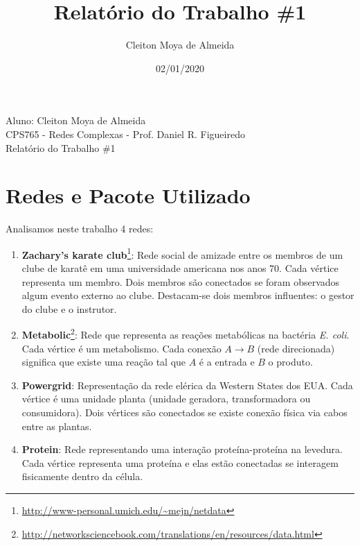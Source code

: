 \documentclass[12pt,a4paper]{article}
\author{\large Cleiton Moya de Almeida}
\title{Relatório do Trabalho \#1}
\date{02/01/2020}
\begin{document}
	
	
	\begin{flushleft}
		\sc Aluno: Cleiton Moya de Almeida \\
		\sc CPS765 - Redes Complexas - Prof. Daniel R. Figueiredo \\
		\sc Relatório do Trabalho \#1
	\end{flushleft}
	
%	
	
	\section{Redes e Pacote Utilizado}
	
	Analisamos neste trabalho 4 redes:
	
	\begin{enumerate}
		\item \textbf{Zachary's karate club}\footnote{\url{http://www-personal.umich.edu/~mejn/netdata}}: Rede social de amizade entre os membros de um clube de karatê em uma universidade americana nos anos 70. Cada vértice representa um membro. Dois membros são conectados se foram observados algum evento externo ao clube. Destacam-se dois membros influentes: o gestor do clube e o instrutor.
		
		\item \textbf{Metabolic}\footnote{\url{http://networksciencebook.com/translations/en/resources/data.html}}: Rede que representa as reações metabólicas na bactéria \textit{E. coli}. Cada vértice é um metabolismo. Cada conexão $A \rightarrow B$ (rede direcionada) significa que existe uma reação tal que $A$ é a entrada e $B$ o produto.
		
		\item \textbf{Powergrid}\footnotemark[2]: Representação da rede elérica da Western States dos EUA. Cada vértice é uma unidade planta (unidade geradora, transformadora ou consumidora). Dois vértices são conectados se existe conexão física via cabos entre as plantas.
		
		\item \textbf{Protein}\footnotemark[2]: Rede representando uma interação proteína-proteína na levedura. Cada vértice representa uma proteína e elas estão conectadas se interagem fisicamente dentro da célula.

	\end{enumerate}
	
\end{document}
